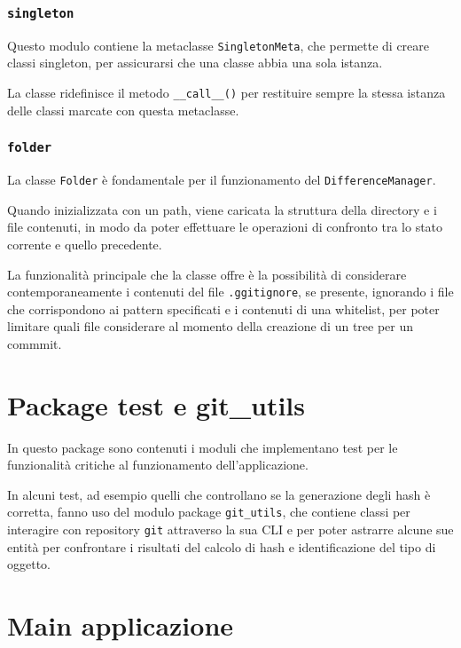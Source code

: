 \subsubsection{\texttt{singleton}}

Questo modulo contiene la metaclasse \texttt{SingletonMeta}, che permette di creare classi singleton, per assicurarsi che una classe abbia una sola istanza.

La classe ridefinisce il metodo \texttt{\_\_call\_\_()} per restituire sempre la stessa istanza delle classi marcate con questa metaclasse.

\subsubsection{\texttt{folder}}

La classe \texttt{Folder} è fondamentale per il funzionamento del \texttt{DifferenceManager}.

Quando inizializzata con un path, viene caricata la struttura della directory e i file contenuti, in modo da poter effettuare le operazioni di confronto tra lo stato corrente e quello precedente.

La funzionalità principale che la classe offre è la possibilità di considerare contemporaneamente i contenuti del file \texttt{.ggitignore}, se presente, ignorando i file che corrispondono ai pattern specificati e i contenuti di una whitelist, per poter limitare quali file considerare al momento della creazione di un tree per un commmit.

\section{Package test e git\_utils}



In questo package sono contenuti i moduli che implementano test per le funzionalità critiche al funzionamento dell'applicazione.

In alcuni test, ad esempio quelli che controllano se la generazione degli hash è corretta, fanno uso del modulo package \texttt{git\_utils}, che contiene classi per interagire con repository \texttt{git} attraverso la sua CLI e per poter astrarre alcune sue entità per confrontare i risultati del calcolo di hash e identificazione del tipo di oggetto.

\section{Main applicazione}

